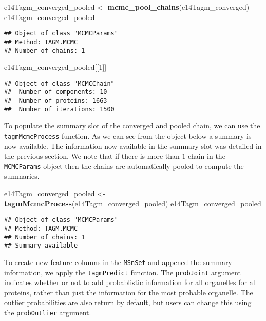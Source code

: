 \documentclass[]{article}
\newenvironment{Shaded}{\begin{snugshade}}{\end{snugshade}}
\newcommand{\KeywordTok}[1]{\textcolor[rgb]{0.13,0.29,0.53}{\textbf{{#1}}}}
\newcommand{\DecValTok}[1]{\textcolor[rgb]{0.00,0.00,0.81}{{#1}}}
\newcommand{\StringTok}[1]{\textcolor[rgb]{0.31,0.60,0.02}{{#1}}}
\newcommand{\NormalTok}[1]{{#1}}
\begin{document}
\begin{Shaded}
\begin{Highlighting}[]
\NormalTok{e14Tagm_converged_pooled <-}\StringTok{ }\KeywordTok{mcmc_pool_chains}\NormalTok{(e14Tagm_converged)}
\NormalTok{e14Tagm_converged_pooled}
\end{Highlighting}
\end{Shaded}

\begin{verbatim}
## Object of class "MCMCParams"
## Method: TAGM.MCMC 
## Number of chains: 1
\end{verbatim}

\begin{Shaded}
\begin{Highlighting}[]
\NormalTok{e14Tagm_converged_pooled[[}\DecValTok{1}\NormalTok{]]}
\end{Highlighting}
\end{Shaded}

\begin{verbatim}
## Object of class "MCMCChain"
##  Number of components: 10 
##  Number of proteins: 1663 
##  Number of iterations: 1500
\end{verbatim}

To populate the summary slot of the converged and pooled chain, we can
use the \texttt{tagmMcmcProcess} function. As we can see from the object
below a summary is now available. The information now available in the
summary slot was detailed in the previous section. We note that if there
is more than \(1\) chain in the \texttt{MCMCParams} object then the
chains are automatically pooled to compute the summaries.

\begin{Shaded}
\begin{Highlighting}[]
\NormalTok{e14Tagm_converged_pooled <-}\StringTok{ }\KeywordTok{tagmMcmcProcess}\NormalTok{(e14Tagm_converged_pooled)}
\NormalTok{e14Tagm_converged_pooled}
\end{Highlighting}
\end{Shaded}

\begin{verbatim}
## Object of class "MCMCParams"
## Method: TAGM.MCMC 
## Number of chains: 1 
## Summary available
\end{verbatim}

To create new feature columns in the \texttt{MSnSet} and appened the
summary information, we apply the \texttt{tagmPredict} function. The
\texttt{probJoint} argument indicates whether or not to add probablistic
information for all organelles for all proteins, rather than just the
information for the most probable organelle. The outlier probabilities
are also return by default, but users can change this using the
\texttt{probOutlier} argument.
\end{document}
